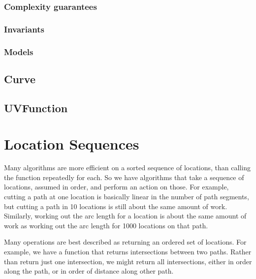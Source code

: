 \documentclass[openany]{book}
\begin{document}
\subsubsection{Complexity guarantees}

\subsubsection{Invariants}

\subsubsection{Models}

\subsection{Curve}

\subsection{UVFunction}

\section{Location Sequences}

Many algorithms are more efficient on a sorted sequence of locations,
than calling the function repeatedly for each.  So we have algorithms
that take a sequence of locations, assumed in order, and perform an
action on those.  For example, cutting a path at one location is
basically linear in the number of path segments, but cutting a path in
10 locations is still about the same amount of work.  Similarly,
working out the arc length for a location is about the same amount of
work as working out the arc length for 1000 locations on that path.

Many operations are best described as returning an ordered set of
locations.  For example, we have a function that returns
intersections between two paths.  Rather than return just one
intersection, we might return all intersections, either in order along
the path, or in order of distance along other path.
\end{document}
